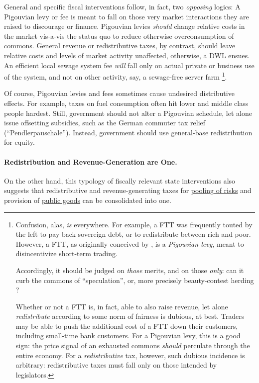 General and specific fiscal interventions follow, in fact, two \emph{opposing} logics: A Pigouvian levy or fee is meant to fall on those very market interactions they are raised to discourage or finance. Pigouvian levies \emph{should} change relative costs in the market vis-a-vis the status quo to reduce otherwise overconsumption of commons. General revenue or redistributive taxes, by contrast, should leave relative costs and levels of market activity unaffected, otherwise, a \gls{DWL} ensues. An efficient local sewage system fee \emph{will} fall only on actual private or business use of the system, and not on other activity, say, a sewage-free server farm \footnote{
	Confusion, alas, \emph{is} everywhere. For example, a \gls{FTT} was frequently touted by the left to pay back sovereign debt, or to redistribute between rich and poor. However, a \gls{FTT}, as originally conceived by \cite{Tobin1970}, is a \emph{Pigouvian levy}, meant to disincentivize short-term trading.
	
	Accordingly, it should be judged on \emph{those} merits, and on those \emph{only}: can it curb the commons of ``speculation'', or, more precisely beauty-contest \citep{Keynes1936} herding \citep{Banerjee-1992-aa}?
	 
	Whether or not a \gls{FTT} is, in fact, able to also raise revenue, let alone \emph{redistribute} according to some norm of fairness is dubious, at best. Traders may be able to push the additional cost of a \gls{FTT} down their customers, including small-time bank customers. For a Pigouvian levy, this is a good sign: the price signal of an exhausted commons \emph{should} perculate through the entire economy. For a \emph{redistributive} tax, however, such dubious incidence is arbitrary: redistributive taxes must fall only on those intended by legislators.}. %
	

Of course, Pigouvian levies and fees sometimes cause undesired distributive effects. For example, taxes on fuel consumption often hit lower and middle class people hardest. Still, government should not alter a Pigouvian schedule, let alone issue offsetting subsidies, such as the German commuter tax relief (``Pendlerpauschale''). Instead, government should use general-base redistribution for equity.

\paragraph{Redistribution and Revenue-Generation are One.} \label{sec:RedistributionAndRevenueAreOne} On the other hand, this typology of fiscally relevant state interventions also suggests that redistributive and revenue-generating taxes for \hyperref[sec:RiskPooling]{pooling of risks} and provision of \hyperref[sec:PublicGoods]{public goods} can be consolidated into one.

